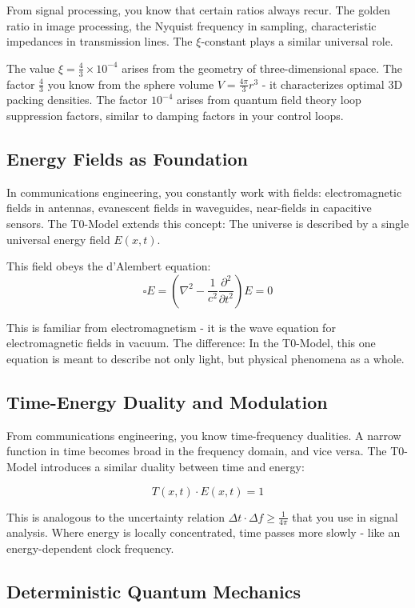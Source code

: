 From signal processing, you know that certain ratios always recur. The golden ratio in image processing, the Nyquist frequency in sampling, characteristic impedances in transmission lines. The $\xi$-constant plays a similar universal role.

The value $\xi = \frac{4}{3} \times 10^{-4}$ arises from the geometry of three-dimensional space. The factor $\frac{4}{3}$ you know from the sphere volume $V = \frac{4\pi}{3}r^3$ - it characterizes optimal 3D packing densities. The factor $10^{-4}$ arises from quantum field theory loop suppression factors, similar to damping factors in your control loops.

\subsection{Energy Fields as Foundation}

In communications engineering, you constantly work with fields: electromagnetic fields in antennas, evanescent fields in waveguides, near-fields in capacitive sensors. The T0-Model extends this concept: The universe is described by a single universal energy field $E(x,t)$.

This field obeys the d'Alembert equation:
$$\square E = \left(\nabla^2 - \frac{1}{c^2}\frac{\partial^2}{\partial t^2}\right) E = 0$$

This is familiar from electromagnetism - it is the wave equation for electromagnetic fields in vacuum. The difference: In the T0-Model, this one equation is meant to describe not only light, but physical phenomena as a whole.

\subsection{Time-Energy Duality and Modulation}

From communications engineering, you know time-frequency dualities. A narrow function in time becomes broad in the frequency domain, and vice versa. The T0-Model introduces a similar duality between time and energy:

$$T(x,t) \cdot E(x,t) = 1$$

This is analogous to the uncertainty relation $\Delta t \cdot \Delta f \geq \frac{1}{4\pi}$ that you use in signal analysis. Where energy is locally concentrated, time passes more slowly - like an energy-dependent clock frequency.

\subsection{Deterministic Quantum Mechanics}

